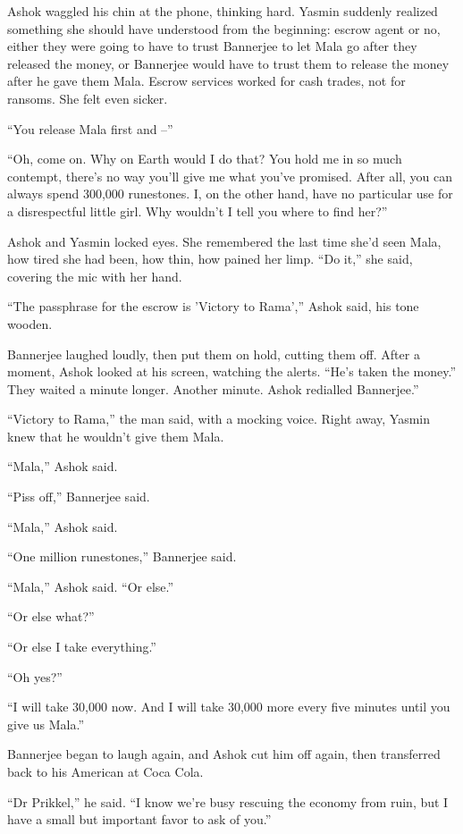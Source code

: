 Ashok waggled his chin at the phone, thinking hard. Yasmin suddenly
realized something she should have understood from the beginning:
escrow agent or no, either they were going to have to trust
Bannerjee to let Mala go after they released the money, or
Bannerjee would have to trust them to release the money after he
gave them Mala. Escrow services worked for cash trades, not for
ransoms. She felt even sicker.

``You release Mala first and --''

``Oh, come on. Why on Earth would I do that? You hold me in so much
contempt, there's no way you'll give me what you've promised. After
all, you can always spend 300,000 runestones. I, on the other hand,
have no particular use for a disrespectful little girl. Why
wouldn't I tell you where to find her?''

Ashok and Yasmin locked eyes. She remembered the last time she'd
seen Mala, how tired she had been, how thin, how pained her limp.
``Do it,'' she said, covering the mic with her hand.

``The passphrase for the escrow is 'Victory to Rama','' Ashok said,
his tone wooden.

Bannerjee laughed loudly, then put them on hold, cutting them off.
After a moment, Ashok looked at his screen, watching the alerts.
``He's taken the money.'' They waited a minute longer. Another
minute. Ashok redialled Bannerjee.''

``Victory to Rama,'' the man said, with a mocking voice. Right away,
Yasmin knew that he wouldn't give them Mala.

``Mala,'' Ashok said.

``Piss off,'' Bannerjee said.

``Mala,'' Ashok said.

``One million runestones,'' Bannerjee said.

``Mala,'' Ashok said. ``Or else.''

``Or else what?''

``Or else I take everything.''

``Oh yes?''

``I will take 30,000 now. And I will take 30,000 more every five
minutes until you give us Mala.''

Bannerjee began to laugh again, and Ashok cut him off again, then
transferred back to his American at Coca Cola.

``Dr Prikkel,'' he said. ``I know we're busy rescuing the economy from
ruin, but I have a small but important favor to ask of you.''

